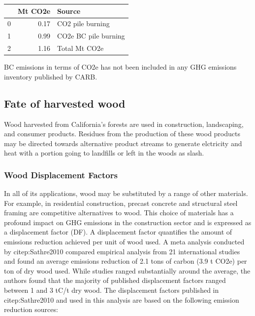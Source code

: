 \documentclass[a4paper]{article}
\begin{document}
\begin{center}
\begin{tabular}{rrl}
 & Mt CO2e & Source\\
\hline
0 & 0.17 & CO2 pile burning\\
1 & 0.99 & CO2e BC pile burning\\
2 & 1.16 & Total Mt CO2e\\
\end{tabular}
\end{center}

BC emissions in terms of CO2e has not been included in any GHG emissions
inventory published by CARB.



\subsection{Fate of harvested wood}
\label{sec-1-3}
Wood harvested from California's forests are used in construction,
landscaping, and consumer products. Residues from the
production of these wood products may be directed towards alternative product streams to generate elctricity and
heat with a portion going to landfills or left in the
woods as slash.

\subsubsection{Wood Displacement Factors}
\label{sec-1-3-1}

In all of its applications, wood may be substituted by a range of other materials. For example, in
residential construction, precast concrete and structural steel framing
are competitive alternatives to wood. This choice of materials has a profound impact on GHG emissions in the
construction sector and is expressed as a displacement
factor (DF). A displacement factor quantifies the amount of emissions
reduction achieved per unit of wood used. A meta analysis conducted by citep:Sathre2010 compared empirical analysis from 21 international studies and found an
average emissions reduction of 2.1 tons of carbon (3.9 t CO2e) per ton
of dry wood used. While studies ranged substantially around the average, the
authors found that the majority of published displacement factors ranged
between 1 and 3 tC/t dry wood. The displacement factors published in
citep:Sathre2010 and used in this analysis are based on the
following emission reduction sources:
\end{document}
